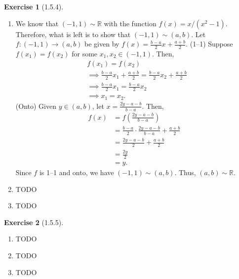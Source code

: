 \documentclass{amsart}
\theoremstyle{definition}
\newtheorem{exercise}{Exercise}
\newcommand{\R}{\mathbb{R}}
\begin{document}
\begin{exercise}[1.5.4]
  \begin{enumerate}[label={(\alph*)}]
    \item We know that $(-1, 1) \sim \R$ with the function $f(x) = x / (x^2 -
      1)$. Therefore, what is left is to show that $(-1, 1) \sim (a, b)$. Let $f
      : (-1, 1) \rightarrow (a, b)$ be given by $f(x) = \frac{b - a}{2} x +
      \frac{a + b}{2}$. (1--1) Suppose $f(x_1) = f(x_2)$ for some $x_1, x_2
      \in (-1, 1)$. Then,
      \begin{align*}
        &f(x_1) = f(x_2) \\
        &\implies \frac{b - a}{2} x_1 + \frac{a + b}{2} = \frac{b - a}{2} x_2
        + \frac{a + b}{2} \\
        &\implies \frac{b - a}{2} x_1 = \frac{b - a}{2} x_2 \\
        &\implies x_1 = x_2.
      \end{align*}
      (Onto) Given $y \in (a, b)$, let $x = \frac{2y - a - b}{b - a}$. Then,
      \begin{align*}
        f(x) &= f\left(\frac{2y - a - b}{b - a}\right) \\
        &= \frac{b - a}{2} \cdot \frac{2y - a - b}{b - a} + \frac{a + b}{2} \\
        &= \frac{2y - a - b}{2} + \frac{a + b}{2} \\
        &= \frac{2y}{2} \\
        &= y.
      \end{align*}
      Since $f$ is 1--1 and onto, we have $(-1, 1) \sim (a, b)$. Thus, $(a, b)
      \sim \R$.
    \item TODO
    \item TODO
  \end{enumerate}
\end{exercise}

\begin{exercise}[1.5.5]
  \begin{enumerate}[label={(\alph*)}]
    \item TODO
    \item TODO
    \item TODO
  \end{enumerate}
\end{exercise}
\end{document}
